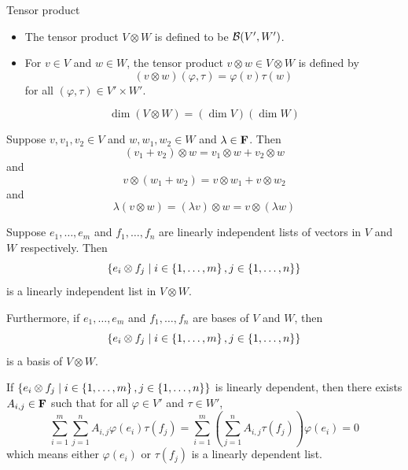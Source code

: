 \documentclass[12pt,a4paper]{article}
\begin{document}
    \begin{defi}{Tensor product}
        \begin{itemize}
            \item The tensor product $V\otimes W$ is defined to be $\mathcal{B}(V',W')$.
            \item For $v\in V$ and $w\in W$, the tensor product $v\otimes w\in V\otimes W$ is defined by
            $$
            (v\otimes w)(\varphi,\tau)=\varphi(v)\tau(w)
            $$
            for all $(\varphi,\tau)\in V'\times W'$.
        \end{itemize}
    \end{defi}
    \begin{prop}
        $$
        \dim(V\otimes W)=(\dim V)(\dim W)
        $$
    \end{prop}
    \hfill

    \begin{prop}
        Suppose $v,v_1,v_2\in V$ and $w,w_1,w_2\in W$ and $\lambda\in\mathbf{F}$. Then
        $$
        (v_1+v_2)\otimes w=v_1\otimes w+v_2\otimes w
        $$
        and
        $$
        v\otimes(w_1+w_2)=v\otimes w_1+v\otimes w_2
        $$
        and
        $$
        \lambda(v\otimes w)=(\lambda v)\otimes w=v\otimes(\lambda w)
        $$
    \end{prop}
    \hfill

    \begin{prop}
        Suppose $e_1,\dots,e_m$ and $f_1,\dots,f_n$ are linearly independent lists of vectors in $V$ and $W$ respectively. Then
        $$
        \left\{e_i\otimes f_j\mid i\in\left\{1,\dots,m\right\},j\in\left\{1,\dots,n\right\}\right\}
        $$
        is a linearly independent list in $V\otimes W$.

        Furthermore, if $e_1,\dots,e_m$ and $f_1,\dots,f_n$ are bases of $V$ and $W$, then
        $$
        \left\{e_i\otimes f_j\mid i\in\left\{1,\dots,m\right\},j\in\left\{1,\dots,n\right\}\right\}
        $$
        is a basis of $V\otimes W$.
    \end{prop}
    \begin{remark}
        If $\left\{e_i\otimes f_j\mid i\in\left\{1,\dots,m\right\},j\in\left\{1,\dots,n\right\}\right\}$ is linearly dependent, then there exists $A_{i,j}\in\mathbf{F}$ such that for all $\varphi\in V'$ and $\tau\in W'$, 
        $$
        \sum_{i=1}^m\sum_{j=1}^nA_{i,j}\varphi(e_i)\tau(f_j)=\sum_{i=1}^m(\sum_{j=1}^nA_{i,j}\tau(f_j))\varphi(e_i)=0
        $$
        which means either $\varphi(e_i)$ or $\tau(f_j)$ is a linearly dependent list.
    \end{remark}
    \hfill
\end{document}

